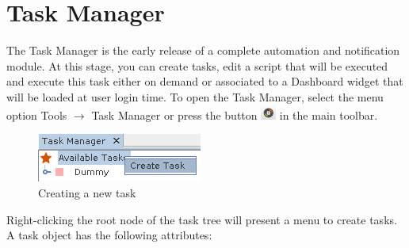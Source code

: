 \documentclass[a4paper]{article}
\begin{document}
	\newpage
	\section{Task Manager} \label{sec:task_manager}
		The Task Manager is the early release of a complete automation and notification module. At this stage, you can create tasks, edit a script that will be executed and execute this task either on demand or associated to a Dashboard widget that will be loaded at user login time. To open the Task Manager, select the menu option Tools $\rightarrow$ Task Manager or press the button \includegraphics[width=0.5cm]{img/icon_task_manager.png} in the main toolbar.\\
		
		\begin{figure}[h!]
			\centering
			\includegraphics[width=0.3\linewidth]{img/task_manager_create_task.png}
			\caption{Creating a new task}
			\label{fig:task_manager_create_task}
		\end{figure}
		
		Right-clicking the root node of the task tree will present a menu to create tasks. A task object has the following attributes:
		
\end{document}
